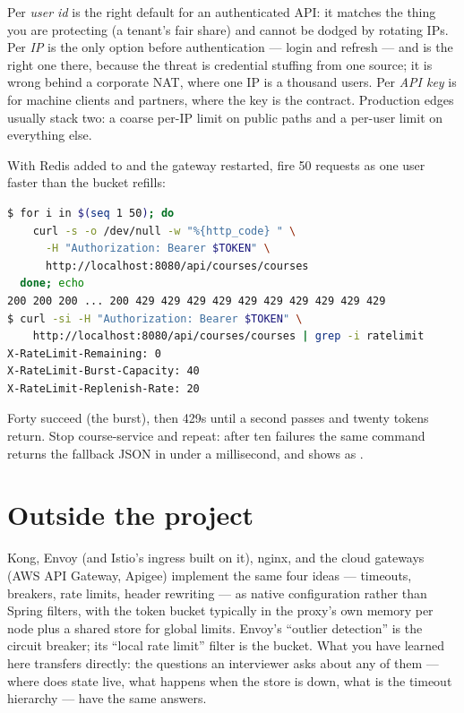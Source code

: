 \begin{decision}
Per \emph{user id} is the right default for an authenticated API: it
matches the thing you are protecting (a tenant's fair share) and cannot
be dodged by rotating IPs. Per \emph{IP} is the only option before
authentication --- login and refresh --- and is the right one there,
because the threat is credential stuffing from one source; it is wrong
behind a corporate NAT, where one IP is a thousand users. Per \emph{API
key} is for machine clients and partners, where the key is the contract.
Production edges usually stack two: a coarse per-IP limit on public
paths and a per-user limit on everything else.
\end{decision}

\begin{handson}
With Redis added to  and the gateway restarted,
fire 50 requests as one user faster than the bucket refills:
\begin{lstlisting}[language=bash]
$ for i in $(seq 1 50); do
    curl -s -o /dev/null -w "%{http_code} " \
      -H "Authorization: Bearer $TOKEN" \
      http://localhost:8080/api/courses/courses
  done; echo
200 200 200 ... 200 429 429 429 429 429 429 429 429 429 429
$ curl -si -H "Authorization: Bearer $TOKEN" \
    http://localhost:8080/api/courses/courses | grep -i ratelimit
X-RateLimit-Remaining: 0
X-RateLimit-Burst-Capacity: 40
X-RateLimit-Replenish-Rate: 20
\end{lstlisting}
Forty succeed (the burst), then 429s until a second passes and twenty
tokens return. Stop course-service and repeat: after ten failures the
same command returns the fallback JSON in under a millisecond, and
\code{/actuator/circuitbreakers} shows \code{courseCb} as \code{OPEN}.
\end{handson}

\section{Outside the project}

Kong, Envoy (and Istio's ingress built on it), nginx, and the cloud
gateways (AWS API Gateway, Apigee) implement the same four ideas ---
timeouts, breakers, rate limits, header rewriting --- as native
configuration rather than Spring filters, with the token bucket
typically in the proxy's own memory per node plus a shared store for
global limits. Envoy's ``outlier detection'' is the circuit breaker;
its ``local rate limit'' filter is the bucket. What you have learned
here transfers directly: the questions an interviewer asks about any of
them --- where does state live, what happens when the store is down,
what is the timeout hierarchy --- have the same answers.

